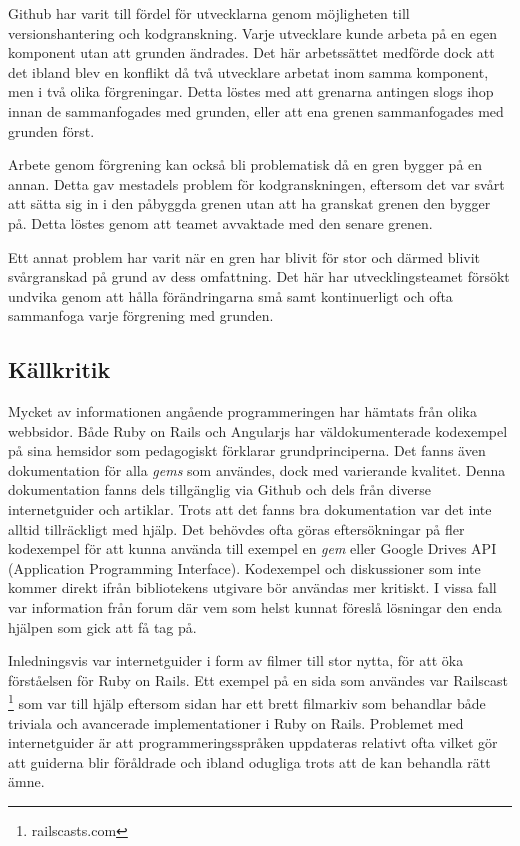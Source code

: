Github har varit till fördel för utvecklarna genom möjligheten till
versionshantering och kodgranskning. Varje utvecklare kunde arbeta på en egen
komponent utan att grunden ändrades. Det här arbetssättet medförde dock att det
ibland blev en konflikt då två utvecklare arbetat inom samma komponent, men i
två olika förgreningar. Detta löstes med att grenarna antingen slogs ihop innan
de sammanfogades med grunden, eller att ena grenen sammanfogades med grunden
först.

Arbete genom förgrening kan också bli problematisk då en gren bygger på en
annan. Detta gav mestadels problem för kodgranskningen, eftersom det var svårt
att sätta sig in i den påbyggda grenen utan att ha granskat grenen den bygger
på. Detta löstes genom att teamet avvaktade med den senare grenen.

Ett annat problem har varit när en gren har blivit för stor och därmed blivit
svårgranskad på grund av dess omfattning. Det här har utvecklingsteamet försökt
undvika genom att hålla förändringarna små  samt kontinuerligt och ofta
sammanfoga varje förgrening med grunden.

\subsection{Källkritik}

Mycket av informationen angående programmeringen har hämtats från olika
webbsidor. Både Ruby on Rails och Angularjs har väldokumenterade kodexempel på
sina hemsidor som pedagogiskt förklarar grundprinciperna. Det fanns även
dokumentation för alla \emph{gems} som användes, dock med varierande kvalitet.
Denna dokumentation fanns dels tillgänglig via Github och dels från diverse
internetguider och artiklar. Trots att det fanns bra dokumentation var det inte
alltid tillräckligt med hjälp. Det behövdes ofta göras eftersökningar på fler
kodexempel för att kunna använda till exempel en \emph{gem} eller Google Drives
API (Application Programming Interface). Kodexempel och diskussioner som inte
kommer direkt ifrån bibliotekens utgivare bör användas mer kritiskt. I vissa
fall var information från forum där vem som helst kunnat föreslå lösningar den
enda hjälpen som gick att få tag på.

Inledningsvis var internetguider i form av filmer till stor nytta, för att öka
förståelsen för Ruby on Rails. Ett exempel på en sida som användes var Railscast
\footnote{railscasts.com} som var till hjälp eftersom sidan har ett brett
filmarkiv som behandlar både triviala och avancerade implementationer i Ruby on
Rails. Problemet med internetguider är att programmeringsspråken uppdateras
relativt ofta vilket gör att guiderna blir föråldrade och ibland odugliga trots
att de kan behandla rätt ämne.

